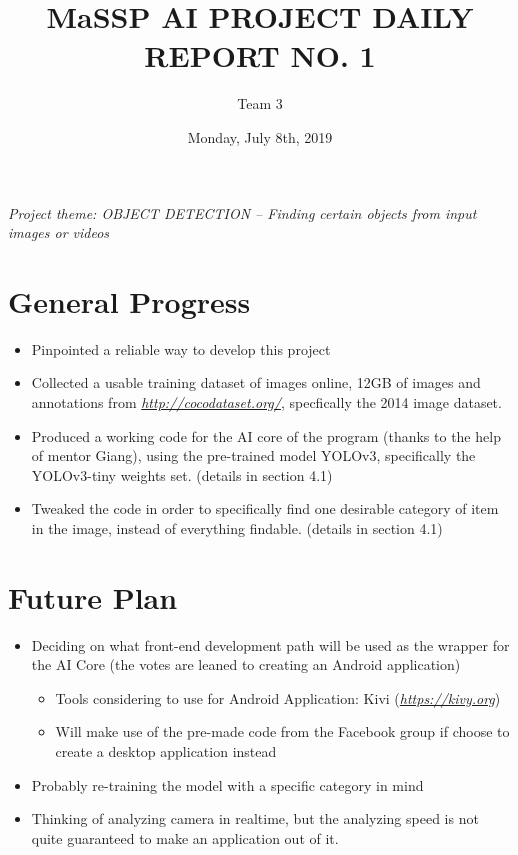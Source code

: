 \documentclass{article}
\title{\textbf{MaSSP AI PROJECT DAILY REPORT NO. 1}}
\author{Team 3}
\date{Monday, July 8th, 2019}
\begin{document}
\maketitle
\textit{Project theme: OBJECT DETECTION – Finding certain objects from input images or videos} 
\graphicspath{ {./images/} }

\section{General Progress }
\begin{itemize}
	\item Pinpointed a reliable way to develop this project
	\item Collected a usable training dataset of images online, 12GB of images and annotations from \emph{ \underline{http://cocodataset.org/}}, specfically the 2014 image dataset.
	\item Produced a working code for the AI core of the program (thanks to the help of mentor Giang), using the pre-trained model YOLOv3, specifically the YOLOv3-tiny weights set. (details in section 4.1)
	\item Tweaked the code in order to specifically find one desirable category of item in the image, instead of everything findable. (details in section 4.1)
\end{itemize}


\section{Future Plan}

\begin{itemize}
	\item Deciding on what front-end development path will be used as the wrapper for the AI Core (the votes are leaned to creating an Android application)
	\begin{itemize}
		\item Tools considering to use for Android Application: Kivi (\emph{\underline{https://kivy.org}})
		\item Will make use of the pre-made code from the Facebook group if choose to create a desktop application instead
	\end{itemize}
	\item Probably re-training the model with a specific category in mind
	\item Thinking of analyzing camera in realtime, but the analyzing speed is not quite guaranteed to make an application out of it.
\end{itemize}
\end{document}
